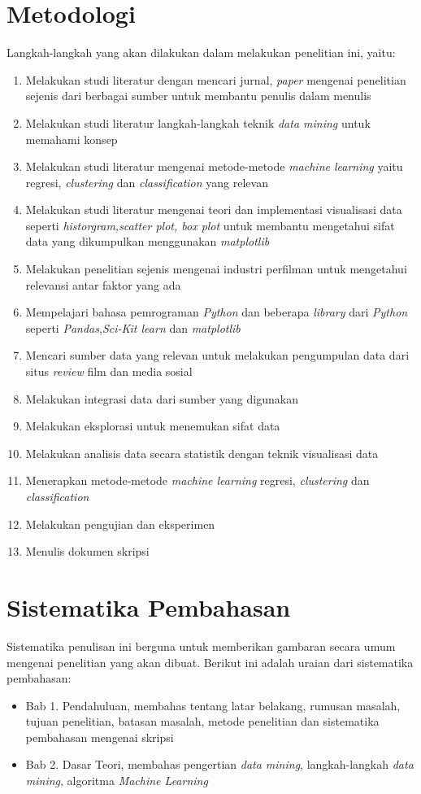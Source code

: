 \section{Metodologi}
\label{sec:metlit}
Langkah-langkah yang akan dilakukan dalam melakukan penelitian ini, yaitu: 
\begin{enumerate}
\item Melakukan studi literatur dengan mencari jurnal, \textit{paper} mengenai penelitian sejenis dari berbagai sumber untuk membantu penulis dalam menulis 
\item Melakukan studi literatur langkah-langkah teknik \textit{data mining} untuk memahami konsep
\item Melakukan studi literatur mengenai metode-metode \textit{machine learning} yaitu regresi, \textit{clustering} dan \textit{classification} yang relevan
\item Melakukan studi literatur mengenai teori dan implementasi visualisasi data seperti \textit{historgram,scatter plot, box plot} untuk membantu mengetahui sifat data yang dikumpulkan menggunakan \textit{matplotlib}
\item Melakukan penelitian sejenis mengenai industri perfilman untuk mengetahui relevansi antar faktor yang ada 
\item Mempelajari bahasa pemrograman \textit{Python} dan beberapa \textit{library} dari \textit{Python}  seperti \textit{Pandas},\textit{Sci-Kit learn} dan \textit{matplotlib}
\item Mencari sumber data yang relevan untuk melakukan pengumpulan data dari situs \textit{review} film dan media sosial
\item Melakukan integrasi data dari sumber yang digunakan
\item Melakukan eksplorasi untuk menemukan sifat data
\item Melakukan analisis data secara statistik  dengan teknik visualisasi data 
\item Menerapkan metode-metode \textit{machine learning} regresi, \textit{clustering} dan \textit{classification}
\item Melakukan pengujian dan eksperimen  
\item Menulis dokumen skripsi
\end{enumerate}

\section{Sistematika Pembahasan}
\label{sec:sispem}
Sistematika penulisan ini berguna untuk memberikan gambaran secara umum mengenai penelitian
yang akan dibuat. Berikut ini adalah uraian dari sistematika pembahasan:  

\begin{itemize}
\item Bab 1. Pendahuluan, membahas tentang latar belakang, rumusan masalah, tujuan penelitian, batasan masalah, metode penelitian dan sistematika pembahasan mengenai skripsi

\item Bab 2. Dasar Teori, membahas pengertian \textit{data mining}, langkah-langkah \textit{data mining}, algoritma \textit{Machine Learning}
\end{itemize}

